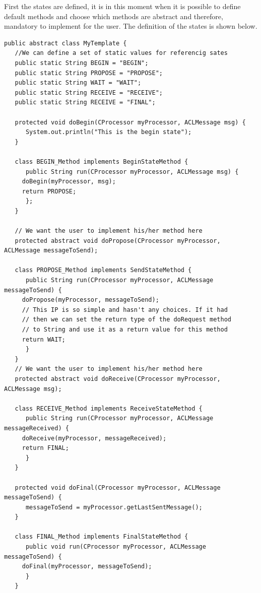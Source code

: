 First the states are defined, it is in this moment when it is possible to define default methods and choose which methods are abstract and therefore, mandatory to implement for the user. The definition of the states is shown below.
\begin{lstlisting}[style=Java]
public abstract class MyTemplate {
   //We can define a set of static values for referencig sates
   public static String BEGIN = "BEGIN";
   public static String PROPOSE = "PROPOSE";
   public static String WAIT = "WAIT";
   public static String RECEIVE = "RECEIVE";
   public static String RECEIVE = "FINAL";

   protected void doBegin(CProcessor myProcessor, ACLMessage msg) {
      System.out.println("This is the begin state");
   }

   class BEGIN_Method implements BeginStateMethod {
      public String run(CProcessor myProcessor, ACLMessage msg) {
	 doBegin(myProcessor, msg);
	 return PROPOSE;
      };
   }

   // We want the user to implement his/her method here
   protected abstract void doPropose(CProcessor myProcessor, ACLMessage messageToSend);

   class PROPOSE_Method implements SendStateMethod {
      public String run(CProcessor myProcessor, ACLMessage messageToSend) {
	 doPropose(myProcessor, messageToSend);
	 // This IP is so simple and hasn't any choices. If it had
	 // then we can set the return type of the doRequest method
	 // to String and use it as a return value for this method
	 return WAIT;
      }
   }
   // We want the user to implement his/her method here
   protected abstract void doReceive(CProcessor myProcessor, ACLMessage msg);

   class RECEIVE_Method implements ReceiveStateMethod {
      public String run(CProcessor myProcessor, ACLMessage messageReceived) {
	 doReceive(myProcessor, messageReceived);
	 return FINAL;
      }
   }

   protected void doFinal(CProcessor myProcessor, ACLMessage messageToSend) {
      messageToSend = myProcessor.getLastSentMessage();
   }

   class FINAL_Method implements FinalStateMethod {
      public void run(CProcessor myProcessor, ACLMessage messageToSend) {
	 doFinal(myProcessor, messageToSend);
      }
   }
\end{lstlisting}

